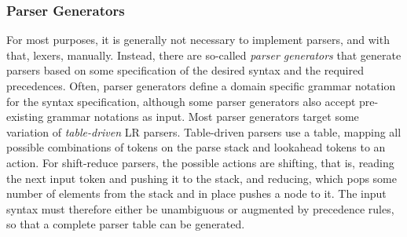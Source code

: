 \subsubsection{Parser Generators}\label{sec:parser_generators}

For most purposes, it is generally not necessary to implement parsers, and with that, lexers, manually.
Instead, there are so-called \emph{parser generators} that generate parsers based on some specification of the desired syntax and the required precedences.
Often, parser generators define a domain specific grammar notation for the syntax specification, although some parser generators also accept pre-existing grammar notations as input.
Most parser generators target some variation of \emph{table-driven} LR parsers.
Table-driven parsers use a table, mapping all possible combinations of tokens on the parse stack and lookahead tokens to an action.
For shift-reduce parsers, the possible actions are shifting, that is, reading the next input token and pushing it to the stack, and reducing, which pops some number of elements from the stack and in place pushes a node to it.
The input syntax must therefore either be unambiguous or augmented by precedence rules, so that a complete parser table can be generated.
